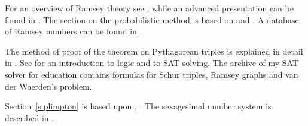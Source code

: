 For an overview of Ramsey theory see \cite{burton}, while an advanced presentation can be found in \cite{rudiments}. The section on the probabilistic method is based on \cite[Example~4o]{ross} and \cite[Chapter~4]{burton}. A database of Ramsey numbers can be found in \cite{mckay}.

The method of proof of the theorem on Pythagorean triples is explained in detail in \cite{brute}. See \cite{mlcs} for an introduction to logic and to SAT solving. The archive of my SAT solver for education \cite{joss} contains formulas for Schur triples, Ramsey graphs and van der Waerden's problem. 

Section~\ref{s.plimpton} is based upon \cite{wiki:plimpton}, \cite{robson}. 
The sexagesimal number system is described in \cite{wiki:sexagesimal}.
